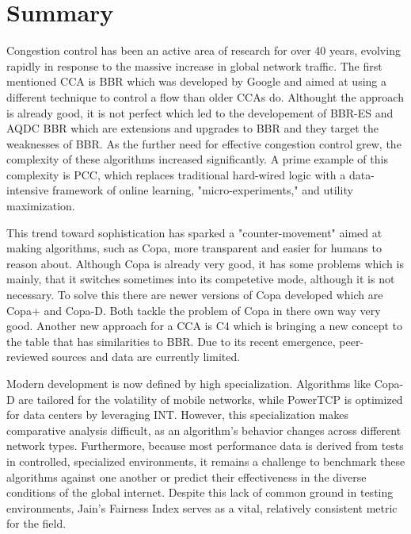 
\section{Summary}\label{sec:Summary}

Congestion control has been an active area of research for over 40 years, evolving rapidly in response to the massive increase in global network traffic. 
The first mentioned \ac{CCA} is BBR which was developed by Google and aimed at using a different technique to control a flow than older \ac{CCA}s do.
Althought the approach is already good, it is not perfect which led to the developement of BBR-ES and AQDC BBR which are extensions and upgrades to BBR and they target the weaknesses of BBR.
As the further need for effective congestion control grew, the complexity of these algorithms increased significantly. 
A prime example of this complexity is PCC, which replaces traditional hard-wired logic with a data-intensive framework of online learning, "micro-experiments," and utility maximization.  

This trend toward sophistication has sparked a "counter-movement" aimed at making algorithms, such as Copa, more transparent and easier for humans to reason about. 
Although Copa is already very good, it has some problems which is mainly, that it switches sometimes into its competetive mode, although it is not necessary.
To solve this there are newer versions of Copa developed which are Copa+ and Copa-D.
Both tackle the problem of Copa in there own way very good.
Another new approach for a \ac{CCA} is C4 which is bringing a new concept to the table that has similarities to BBR.
Due to its recent emergence, peer-reviewed sources and data are currently limited.

Modern development is now defined by high specialization. 
Algorithms like Copa-D are tailored for the volatility of mobile networks, while PowerTCP is optimized for data centers by leveraging INT.  
However, this specialization makes comparative analysis difficult, as an algorithm's behavior changes across different network types. 
Furthermore, because most performance data is derived from tests in controlled, specialized environments, it remains a challenge to benchmark these algorithms against one another or predict their effectiveness in the diverse conditions of the global internet.
Despite this lack of common ground in testing environments, Jain's Fairness Index serves as a vital, relatively consistent metric for the field. 
